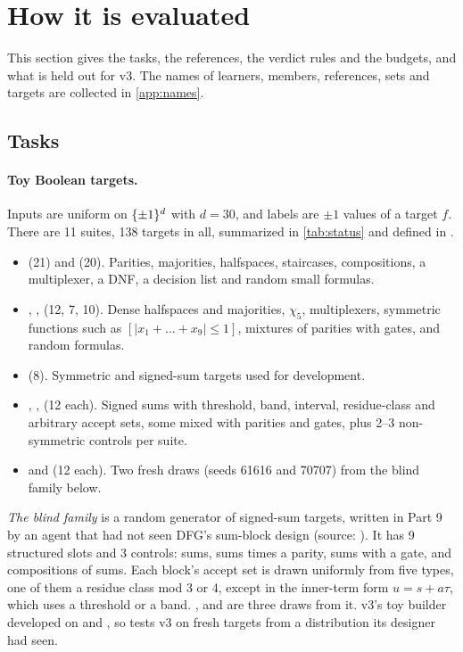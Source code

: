 \section{How it is evaluated}\label{sec:protocol}

This section gives the tasks, the references, the verdict rules and the budgets, and what is held out for v3. The names of learners, members, references, sets and targets are collected in \cref{app:names}.

\subsection{Tasks}\label{sec:tasks}

\paragraph{Toy Boolean targets.} Inputs are uniform on $\{\pm1\}^d$ with $d=30$, and labels are $\pm1$ values of a target $f$. There are 11 suites, 138 targets in all, summarized in \cref{tab:status} and defined in .
\begin{itemize}
\item {} (21) and  (20). Parities, majorities, halfspaces, staircases, compositions, a multiplexer, a DNF, a decision list and random small formulas.
\item {}, ,  (12, 7, 10). Dense halfspaces and majorities, $\chi_5$, multiplexers, symmetric functions such as $[|x_1+\dots+x_9|\le1]$, mixtures of parities with gates, and random formulas.
\item {} (8). Symmetric and signed-sum targets used for development.
\item {}, ,  (12 each). Signed sums with threshold, band, interval, residue-class and arbitrary accept sets, some mixed with parities and gates, plus 2--3 non-symmetric controls per suite.
\item {} and  (12 each). Two fresh draws (seeds 61616 and 70707) from the blind family below.
\end{itemize}
\emph{The blind family} is a random generator of signed-sum targets, written in Part 9 by an agent that had not seen DFG's sum-block design (source: ). It has 9 structured slots and 3 controls: sums, sums times a parity, sums with a gate, and compositions of sums. Each block's accept set is drawn uniformly from five types, one of them a residue class mod 3 or 4, except in the inner-term form $u=s+a\tau$, which uses a threshold or a band. ,  and  are three draws from it. v3's toy builder developed on  and , so  tests v3 on fresh targets from a distribution its designer had seen.

